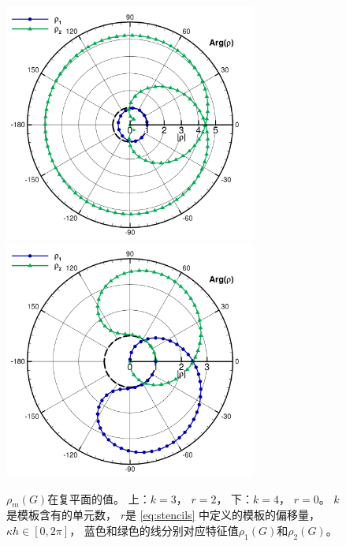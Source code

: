 \begin{figure}[htbp]
  \centering
  \includegraphics[width=0.74\textwidth]{fig/1D/pol62.pdf}
  \includegraphics[width=0.74\textwidth]{fig/1D/pol80.pdf}
  \caption{$\rho_m(G)$在复平面的值。
    上：$k=3$，
    $r=2$，
    下：$k=4$，
    $r=0$。
    $k$是模板含有的单元数，
    $r$是 \cref{eq:stencils} 中定义的模板的偏移量，
    $\kappa h\in [0,2\pi]$，
    蓝色和绿色的线分别对应特征值$\rho_1(G)$和$\rho_2(G)$。
  }
  \label{fig:eigens-3}
\end{figure}

